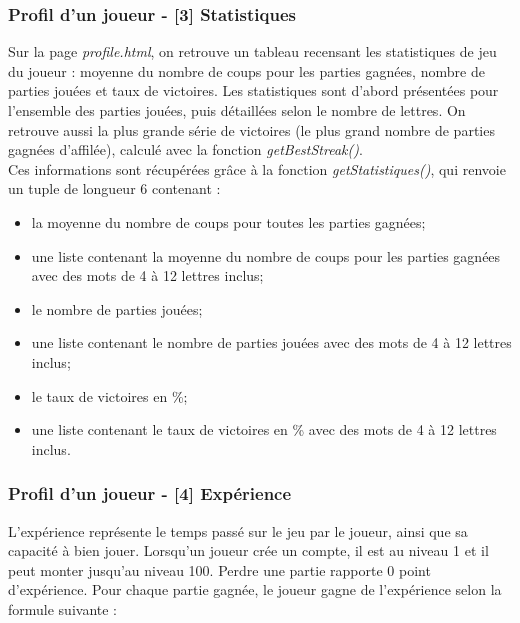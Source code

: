 \subsubsection*{Profil d'un joueur - [3] Statistiques}

\tabto{1cm}Sur la page \emph{profile.html}, on retrouve un tableau recensant les statistiques de jeu du joueur : moyenne du nombre de coups pour les parties gagnées, nombre de parties jouées et taux de victoires. Les statistiques sont d'abord présentées pour l'ensemble des parties jouées, puis détaillées selon le nombre de lettres. On retrouve aussi la plus grande série de victoires (le plus grand nombre de parties gagnées d'affilée), calculé avec la fonction \emph{getBestStreak()}.\\

\tabto{0cm}Ces informations sont récupérées grâce à la fonction \emph{getStatistiques()}, qui renvoie un tuple de longueur 6 contenant :
\begin{itemize}
    \item la moyenne du nombre de coups pour toutes les parties gagnées;
    \item une liste contenant la moyenne du nombre de coups pour les parties gagnées avec des mots de 4 à 12 lettres inclus;
    \item le nombre de parties jouées;
    \item une liste contenant le nombre de parties jouées avec des mots de 4 à 12 lettres inclus;
    \item le taux de victoires en \%;
    \item une liste contenant le taux de victoires en \% avec des mots de 4 à 12 lettres inclus.
\end{itemize}


\subsubsection*{Profil d'un joueur - [4] Expérience}

\tabto{1cm}L'expérience représente le temps passé sur le jeu par le joueur, ainsi que sa capacité à bien jouer. Lorsqu'un joueur crée un compte, il est au niveau 1 et il peut monter jusqu'au niveau 100. Perdre une partie rapporte 0 point d'expérience. Pour chaque partie gagnée, le joueur gagne de l'expérience selon la formule suivante :

